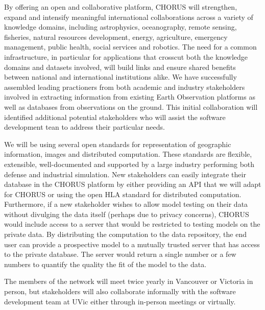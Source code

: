 By offering an open and collaborative platform, CHORUS will
strengthen, expand and intensify meaningful international
collaborations across a variety of knowledge domains, including
astrophysics, oceanography, remote sensing, fisheries, natural
resources development, energy, agriculture, emergency management,
public health, social services and robotics.  The need for a common
infrastructure, in particular for applications that crosscut both the
knowledge domains and datasets involved, will build links and ensure
shared benefits between national and international institutions alike.
We have successfully assembled leading practioners from both academic
and industry stakeholders involved in extracting information from
existing Earth Observation platforms as well as databases from
observations on the ground.  This initial collaboration will identified
additional potential stakeholders who will assist the software development
tean to address their particular needs.

We will be using several open standards for representation of
geographic information, images and distributed computation.  These
standards are flexible, extensible, well-documented and supported by a
large industry performing both defense and industrial simulation.  New
stakeholders can easily integrate their database in the CHORUS
platform by either providing an API that we will adapt for CHORUS or
using the open HLA standard for distributed computation.  Furthermore,
if a new stakeholder wishes to allow model testing on their data
without divulging the data itself (perhaps due to privacy concerns),
CHORUS would include access to a server that would be restricted to
testing models on the private data.  By distributing the computation
to the data repository, the end user can provide a prospective model
to a mutually trusted server that has access to the private database.
The server would return a single number or a few numbers to quantify
the quality the fit of the model to the data.

The members of the network will meet twice yearly in Vancouver or
Victoria in person, but stakeholders will also collaborate informally
with the software development team at UVic either through in-person
meetings or virtually.


          
